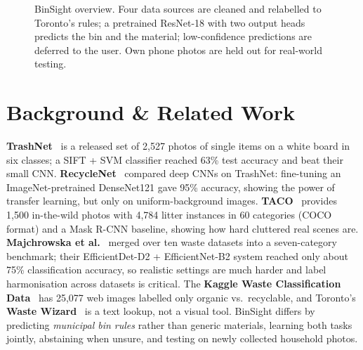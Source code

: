 \documentclass[final]{article}
\begin{document}
\begin{figure}[!h]
{}
  \caption{BinSight overview. Four data sources are cleaned and relabelled to Toronto's rules; a pretrained ResNet-18 with two output heads predicts the bin and the material; low-confidence predictions are deferred to the user. Own phone photos are held out for real-world testing.}
  \label{fig:overview}
\end{figure}

\section*{Background \& Related Work}
\textbf{TrashNet}~\cite{thung2016} is a released set of 2,527 photos of single items on a white board in six classes; a SIFT + SVM classifier reached 63\% test accuracy and beat their small CNN. \textbf{RecycleNet}~\cite{bircanoglu2018} compared deep CNNs on TrashNet: fine-tuning an ImageNet-pretrained DenseNet121 gave 95\% accuracy, showing the power of transfer learning, but only on uniform-background images. \textbf{TACO}~\cite{proenca2020} provides 1,500 in-the-wild photos with 4,784 litter instances in 60 categories (COCO format) and a Mask R-CNN baseline, showing how hard cluttered real scenes are. \textbf{Majchrowska et al.}~\cite{majchrowska2022} merged over ten waste datasets into a seven-category benchmark; their EfficientDet-D2 + EfficientNet-B2 system reached only about 75\% classification accuracy, so realistic settings are much harder and label harmonisation across datasets is critical. The \textbf{Kaggle Waste Classification Data}~\cite{sekar2019} has 25,077 web images labelled only organic vs.\ recyclable, and Toronto's \textbf{Waste Wizard}~\cite{wastewizard} is a text lookup, not a visual tool. BinSight differs by predicting \emph{municipal bin rules} rather than generic materials, learning both tasks jointly, abstaining when unsure, and testing on newly collected household photos.
\end{document}
